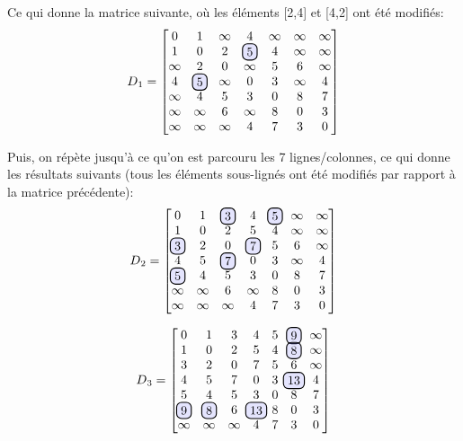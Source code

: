 \documentclass[devoir3.tex]{subfiles}
\begin{document}
Ce qui donne la matrice suivante, où les éléments [2,4] et [4,2] ont été modifiés:
\begin{align*}
	D\textsubscript{1} =
	\begin{bmatrix}
		0 	& 1 	  	& \infty 	& 4 	  	  & \infty 	& \infty & \infty \\
		1 	& 0 		& 2		& \hlight{5}	  & 4		& \infty & \infty \\
		\infty  & 2 		& 0 		& \infty 	  & 5 	  	& 6 	  & \infty \\
		4 	& \hlight{5}	& \infty   	& 0 	  	  & 3	  	& \infty & 4 \\
		\infty  & 4 	 	& 5 		& 3 	  	  & 0 	  	& 8 	  & 7 \\
		\infty  & \infty 	& 6		& \infty 	  & 8 	  	& 0 	  & 3 \\
		\infty 	& \infty 	& \infty 	& 4 	  	  & 7 	  	& 3 	 & 0
	\end{bmatrix}
\end{align*}

Puis, on répète jusqu'à ce qu'on est parcouru les 7 lignes/colonnes, ce qui donne les résultats suivants (tous les éléments sous-lignés ont été modifiés par rapport à la matrice précédente):
\begin{align*}
	D\textsubscript{2} =
	\begin{bmatrix}
		0 		& 1 	  	& \hlight{3} 	& 4 	  	  & \hlight{5}	& \infty & \infty \\
		1 		& 0 		& 2		& 5		  & 4		& \infty & \infty \\
		\hlight{3} 	& 2 		& 0 		& \hlight{7} 	  & 5 	  	& 6 	  & \infty \\
		4 		& 5		& \hlight{7}  	& 0 	  	  & 3	  	& \infty & 4 \\
		\hlight{5}  	& 4 	 	& 5 		& 3 	  	  & 0 	  	& 8 	  & 7 \\
		\infty  	& \infty 	& 6		& \infty 	  & 8 	  	& 0 	  & 3 \\
		\infty 		& \infty 	& \infty 	& 4 	  	  & 7 	  	& 3 	  & 0
	\end{bmatrix}
\end{align*}

\begin{align*}
	D\textsubscript{3} =
	\begin{bmatrix}
		0 		& 1 	  	& 3 		& 4 	  	  & 5		& \hlight{9} 	& \infty \\
		1 		& 0 		& 2		& 5		  & 4		& \hlight{8} 	& \infty \\	
		3	 	& 2 		& 0 		& 7	 	  & 5 	  	& 6 		& \infty \\
		4 		& 5		& 7	  	& 0 	  	  & 3	  	& \hlight{13}	& 4 \\
		5  		& 4 	 	& 5 		& 3 	  	  & 0 	  	& 8 	 	& 7 \\
		\hlight{9}  	& \hlight{8} 	& 6		& \hlight{13}	  & 8 	  	& 0 	 	& 3 \\
		\infty 		& \infty 	& \infty 	& 4 	  	  & 7 	  	& 3 	 	& 0
	\end{bmatrix}
\end{align*}
\end{document}
